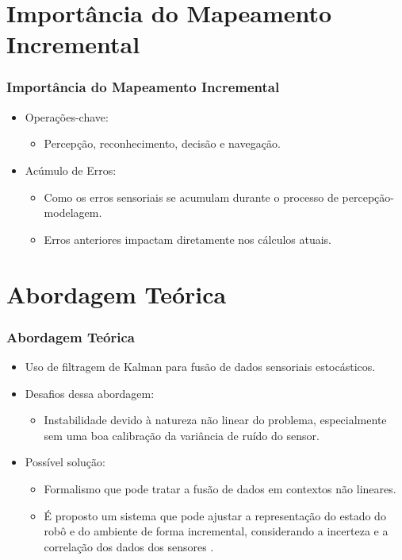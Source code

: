 \documentclass[xcolor=dvipsnames, aspectratio=169]{beamer}
\begin{document}
\section{Importância do Mapeamento Incremental}
\begin{frame}
  \frametitle{Importância do Mapeamento Incremental}
  \begin{itemize}
      \item Operações-chave: 
      \begin{itemize}
        \item Percepção, reconhecimento, decisão e navegação.
      \end{itemize}
      \item Acúmulo de Erros: 
      \begin{itemize}
        \item Como os erros sensoriais se acumulam durante o processo de percepção-modelagem.
        \item Erros anteriores impactam diretamente nos cálculos atuais.
      \end{itemize}
  \end{itemize}
\end{frame}

\section{Abordagem Teórica}
\begin{frame}
  \frametitle{Abordagem Teórica}
  \begin{itemize}
      \item Uso de filtragem de Kalman para fusão de dados sensoriais estocásticos.
      \item Desafios dessa abordagem: 
      \begin{itemize}
        \item Instabilidade devido à natureza não linear do problema, especialmente sem uma boa calibração da variância de ruído do sensor.
      \end{itemize}
      \item Possível solução: 
      \begin{itemize}
        \item Formalismo que pode tratar a fusão de dados em contextos não lineares. 
        \item É proposto um sistema que pode ajustar a representação do estado do robô e do ambiente de forma incremental, considerando a incerteza e a correlação dos dados dos sensores \cite{moutarlier2006experimental}.
      \end{itemize}
  \end{itemize}
\end{frame}
  
\end{document}
